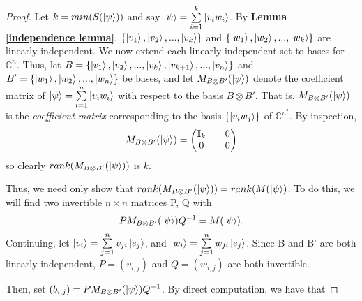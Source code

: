 \begin{proof}
Let $k=min(S(\ket{\psi}))$ and say $\ket{\psi}=\sum\limits_{i=1}^k \ket{v_i w_i}$. By \textbf{Lemma \ref{independence lemma}}, $\{\ket{v_1}, \ket{v_2},...,\ket{v_k}\}$ and $\{\ket{w_1}, \ket{w_2},...,\ket{w_k}\}$ are linearly independent.  We now extend each linearly independent set to bases for $\mathbb{C}^n$. Thus, let $B=\{\ket{v_1}, \ket{v_2},...,\ket{v_k}, \ket{v_{k+1}},...,\ket{v_n}\}$ and $B'=\{\ket{w_1}, \ket{w_2},...,\ket{w_n}\}$ be bases, and let $M_{B \otimes B'}(\ket{\psi})$ denote the coefficient matrix of $\ket{\psi}=\sum\limits_{i=1}^{n}\ket{v_i w_i}$ with respect to the basis $B \otimes B'$. That is, $M_{B \otimes B'}(\ket{\psi})$ is the {\emph{coefficient matrix}} corresponding to the basis $\{\ket{v_i w_j} \}$ of ${\mathbb{C}}^{n^2}$.  By inspection, 
$$M_{B \otimes B'}(\ket{\psi})=\begin{pmatrix}
\mathbb{I}_k && 0 \\
0 && 0
\end{pmatrix}$$
so clearly $rank(M_{B \otimes B'}(\ket{\psi}))$ is $k$.

Thus, we need only show that $rank(M_{B \otimes B'}(\ket{\psi}))=rank(M(\ket{\psi})$.  To do this, we will find two invertible $n \times n$ matrices P, Q with 
\begin{equation}
PM_{B \otimes B'}(\ket{\psi})Q^{-1}=M(\ket{\psi}).
\end{equation}
Continuing, let $\ket{v_i}=\sum\limits_{j=1}^n v_{ji}\ket{e_j}$, and
$\ket{w_i}=\sum\limits_{j=1}^n w_{ji}\ket{e_j}$.  Since B and B' are both linearly independent, $P=(v_{i,j})$ and $Q=(w_{i,j})$ are both invertible.


Then, set $(b_{i,j})=PM_{B \otimes B'}(\ket{\psi})Q^{-1}$.  By direct computation, we have that
\begin{comment}


\end{comment}
\end{proof}
